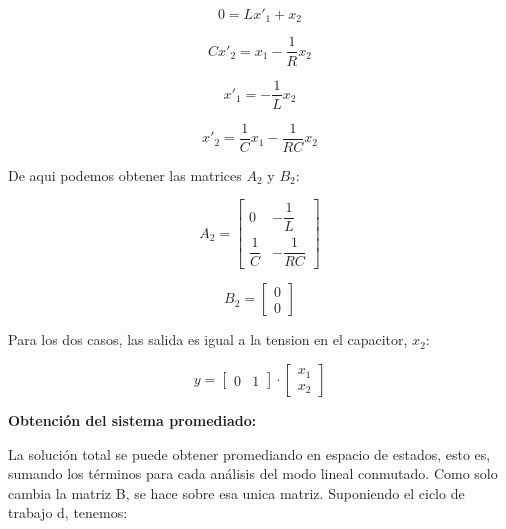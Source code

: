 \vspace{-0.5cm}
\begin{equation}
    0 = Lx'_1 + x_2
\end{equation}

\vspace{-0.5cm}
\begin{equation}
    Cx'_2 = x_1 - \dfrac{1}{R} x_2 
\end{equation}

\vspace{-0.5cm}
\begin{equation}
    x'_1 = -\dfrac{1}{L} x_2
\end{equation}

\vspace{-0.5cm}
\begin{equation}
    x'_2 = \dfrac{1}{C} x_1 - \dfrac{1}{RC} x_2 
\end{equation}

De aqui podemos obtener las matrices $A_2$ y $B_2$:

\begin{equation}
    A_2 = \begin{bmatrix}
        0 & -\dfrac{1}{L}\\
        \dfrac{1}{C} & -\dfrac{1}{RC}
    \end{bmatrix}
\end{equation}

\begin{equation}
    B_2 = \begin{bmatrix}
        0\\
        0
    \end{bmatrix}
\end{equation}

Para los dos casos, las salida es igual a la tension en el capacitor, $x_2$:

\vspace{-0.5cm}
\begin{equation}
    y = \begin{bmatrix}
        0 & 1
    \end{bmatrix}
    \cdot
    \begin{bmatrix}
        x_1 \\
        x_2
    \end{bmatrix}
\end{equation}

\textbf{Obtención del sistema promediado:}

La solución total se puede obtener promediando en espacio de estados, esto es, sumando los términos 
para cada análisis del modo lineal conmutado. Como solo cambia la matriz B, se hace sobre esa unica matriz.
Suponiendo el ciclo de trabajo d, tenemos:

